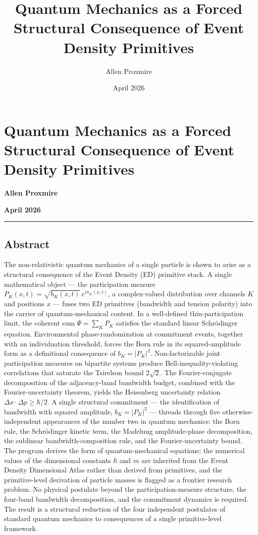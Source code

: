 \documentclass[
  11pt,
]{article}
\title{Quantum Mechanics as a Forced Structural Consequence of Event
Density Primitives}
\author{Allen Proxmire}
\date{April 2026}
\begin{document}
\maketitle

\section{Quantum Mechanics as a Forced Structural Consequence of Event
Density
Primitives}\label{quantum-mechanics-as-a-forced-structural-consequence-of-event-density-primitives}

\textbf{Allen Proxmire}

\textbf{April 2026}

\begin{center}\rule{0.5\linewidth}{0.5pt}\end{center}

\subsection{Abstract}\label{abstract}

The non-relativistic quantum mechanics of a single particle is shown to
arise as a structural consequence of the Event Density (ED) primitive
stack. A single mathematical object --- the participation measure
\(P_K(x,t) = \sqrt{b_K(x,t)} \, e^{i \pi_K(x,t)}\), a complex-valued
distribution over channels \(K\) and positions \(x\) --- fuses two ED
primitives (bandwidth and tension polarity) into the carrier of
quantum-mechanical content. In a well-defined thin-participation limit,
the coherent sum \(\Psi = \sum_K P_K\) satisfies the standard linear
Schrödinger equation. Environmental phase-randomization at commitment
events, together with an individuation threshold, forces the Born rule
in its squared-amplitude form as a definitional consequence of
\(b_K = |P_K|^2\). Non-factorizable joint participation measures on
bipartite systems produce Bell-inequality-violating correlations that
saturate the Tsirelson bound \(2\sqrt{2}\). The Fourier-conjugate
decomposition of the adjacency-band bandwidth budget, combined with the
Fourier-uncertainty theorem, yields the Heisenberg uncertainty relation
\(\Delta x \cdot \Delta p \geq \hbar/2\). A single structural commitment
--- the identification of bandwidth with squared amplitude,
\(b_K = |P_K|^2\) --- threads through five otherwise-independent
appearances of the number two in quantum mechanics: the Born rule, the
Schrödinger kinetic term, the Madelung amplitude-phase decomposition,
the sublinear bandwidth-composition rule, and the Fourier-uncertainty
bound. The program derives the form of quantum-mechanical equations; the
numerical values of the dimensional constants \(\hbar\) and \(m\) are
inherited from the Event Density Dimensional Atlas rather than derived
from primitives, and the primitive-level derivation of particle masses
is flagged as a frontier research problem. No physical postulate beyond
the participation-measure structure, the four-band bandwidth
decomposition, and the commitment dynamics is required. The result is a
structural reduction of the four independent postulates of standard
quantum mechanics to consequences of a single primitive-level framework.
\end{document}
